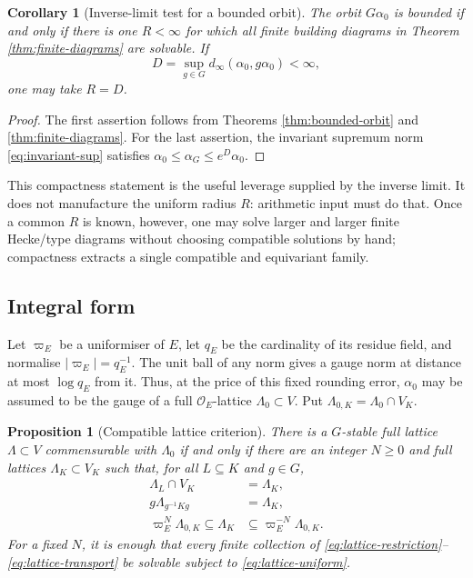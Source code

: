 \documentclass[12pt]{article}
\newtheorem{proposition}[theorem]{Proposition}
\newtheorem{corollary}[theorem]{Corollary}
\theoremstyle{definition}
\theoremstyle{remark}
\newcommand{\dinf}{d_{\infty}}
\newcommand{\Ocoeff}{\mathcal O_E}
\begin{document}
\begin{corollary}[Inverse-limit test for a bounded orbit]
\label{cor:inverse-limit-bounded}
The orbit $G\alpha_0$ is bounded if and only if there is one
$R<\infty$ for which all finite building diagrams in Theorem
\ref{thm:finite-diagrams} are solvable.  If
\[
 D=\sup_{g\in G}\dinf(\alpha_0,g\alpha_0)<\infty,
\]
one may take $R=D$.
\end{corollary}

\begin{proof}
The first assertion follows from Theorems \ref{thm:bounded-orbit} and
\ref{thm:finite-diagrams}.  For the last assertion, the invariant
supremum norm \eqref{eq:invariant-sup} satisfies
$\alpha_0\leq\alpha_G\leq e^D\alpha_0$.
\end{proof}

This compactness statement is the useful leverage supplied by the
inverse limit.  It does not manufacture the uniform radius $R$:
arithmetic input must do that.  Once a common $R$ is known, however,
one may solve larger and larger finite Hecke/type diagrams without
choosing compatible solutions by hand; compactness extracts a single
compatible and equivariant family.

\subsection{Integral form}

Let $\varpi_E$ be a uniformiser of $E$, let
$q_E$ be the cardinality of its residue field, and normalise
$|\varpi_E|=q_E^{-1}$.  The unit ball of any norm gives a gauge norm at
distance at most $\log q_E$ from it.  Thus, at the price of this fixed
rounding error, $\alpha_0$ may be assumed to be the gauge of a full
$\Ocoeff$-lattice $\Lambda_0\subset V$.  Put
$\Lambda_{0,K}=\Lambda_0\cap V_K$.

\begin{proposition}[Compatible lattice criterion]
\label{prop:lattice-limit}
There is a $G$-stable full lattice $\Lambda\subset V$ commensurable
with $\Lambda_0$ if and only if there are an integer $N\geq0$ and full
lattices $\Lambda_K\subset V_K$ such that, for all $L\subseteq K$ and
$g\in G$,
\begin{align}
 \Lambda_L\cap V_K&=\Lambda_K,\label{eq:lattice-restriction}\\
 g\Lambda_{g^{-1}Kg}&=\Lambda_K,\label{eq:lattice-transport}\\
 \varpi_E^N\Lambda_{0,K}
  \subseteq\Lambda_K
  &\subseteq\varpi_E^{-N}\Lambda_{0,K}.
  \label{eq:lattice-uniform}
\end{align}
For a fixed $N$, it is enough that every finite collection of
\eqref{eq:lattice-restriction}--\eqref{eq:lattice-transport} be
solvable subject to \eqref{eq:lattice-uniform}.
\end{proposition}
\end{document}
